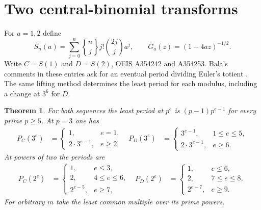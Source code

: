 \documentclass[11pt,letterpaper]{article}
\newtheorem{theorem}{Theorem}[section]
\newcommand{\stir}[2]{\genfrac{\{}{\}}{0pt}{}{#1}{#2}}
\begin{document}
\clearpage
\section{Two central-binomial transforms}

For $a=1,2$ define
\[
 S_n(a)=\sum_{j=0}^n\stir nj j!\binom{2j}{j}a^j,\qquad
 G_a(z)=(1-4az)^{-1/2}.
\]
Write $C=S(1)$ and $D=S(2)$, OEIS A354242 and A354253. Bala's comments
in these entries ask for an eventual period dividing Euler's totient
\cite{OEIS,Danesh}. The same lifting method determines the least period for
each modulus, including a change at $3^6$ for $D$.

\begin{theorem}\label{th:central}
For both sequences the least period at $p^e$ is $(p-1)p^{e-1}$ for every
prime $p\ge5$. At $p=3$ one has
\[
\begin{aligned}
P_C(3^e)&=\begin{cases}1,&e=1,\\2\cdot3^{e-1},&e\ge2,\end{cases}
&
P_{D}(3^e)&=\begin{cases}3^{e-1},&1\le e\le5,\\2\cdot3^{e-1},&e\ge6.\end{cases}
\end{aligned}
\]
At powers of two the periods are
\[
\begin{aligned}
P_C(2^e)&=\begin{cases}1,&e\le3,\\2,&4\le e\le6,\\2^{e-5},&e\ge7,\end{cases}
&
P_{D}(2^e)&=\begin{cases}1,&e\le6,\\2,&7\le e\le8,\\2^{e-7},&e\ge9.\end{cases}
\end{aligned}
\]
For arbitrary $m$ take the least common multiple over its prime powers.
\end{theorem}
\end{document}
